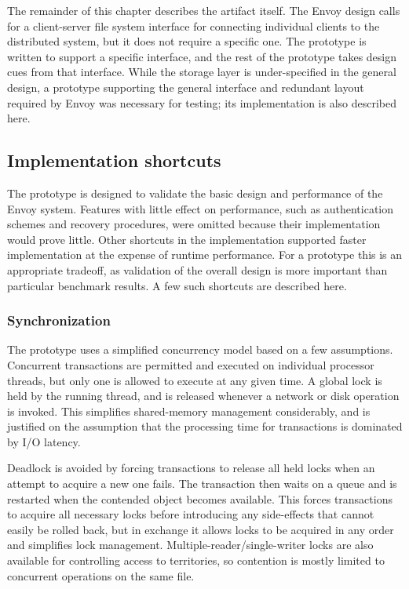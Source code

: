 The remainder of this chapter describes the artifact itself. The Envoy design calls for a client-server file system interface for connecting individual clients to the distributed system, but it does not require a specific one. The prototype is written to support a specific interface, and the rest of the prototype takes design cues from that interface. While the storage layer is under-specified in the general design, a prototype supporting the general interface and redundant layout required by Envoy was necessary for testing; its implementation is also described here.

\subsection{Implementation shortcuts}

The prototype is designed to validate the basic design and performance of the Envoy system. Features with little effect on performance, such as authentication schemes and recovery procedures, were omitted because their implementation would prove little. Other shortcuts in the implementation supported faster implementation at the expense of runtime performance. For a prototype this is an appropriate tradeoff, as validation of the overall design is more important than particular benchmark results. A few such shortcuts are described here.

\subsubsection{Synchronization}

The prototype uses a simplified concurrency model based on a few assumptions. Concurrent transactions are permitted and executed on individual processor threads, but only one is allowed to execute at any given time. A global lock is held by the running thread, and is released whenever a network or disk operation is invoked. This simplifies shared-memory management considerably, and is justified on the assumption that the processing time for transactions is dominated by I/O latency.

Deadlock is avoided by forcing transactions to release all held locks when an attempt to acquire a new one fails. The transaction then waits on a queue and is restarted when the contended object becomes available. This forces transactions to acquire all necessary locks before introducing any side-effects that cannot easily be rolled back, but in exchange it allows locks to be acquired in any order and simplifies lock management. Multiple-reader/single-writer locks are also available for controlling access to territories, so contention is mostly limited to concurrent operations on the same file.

